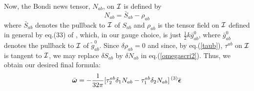 Now, the Bondi news tensor, $N_{ab}$, on ${\cal I}$ is defined by
\cite{g}
\begin{equation}
N_{ab} = \bar{S}_{ab} - \rho_{ab}
\label{news}
\end{equation}
where $\bar{S}_{ab}$ denotes the pullback to ${\cal I}$ of $S_{ab}$
and $\rho_{ab}$ is the tensor field on ${\cal I}$ defined in general
by eq.(33) of \cite{g}, which, in our gauge choice, is just
$\frac{1}{2} k \bar{g}^0_{ab}$, where $\bar{g}^0_{ab}$ denotes the
pullback to $\cal I$ of $\tilde{g}^0_{ab}$. Since $\delta \rho_{ab} =
0$ and since, by eq.(\ref{taub}), $\tau^{ab}$ on ${\cal I}$ is tangent
to ${\cal I}$, we may replace $\delta S_{ab}$ by $\delta N_{ab}$ in
eq.(\ref{omegascri2}). Thus, we obtain our desired final formula:
\begin{equation}
\bar{\mbox{\boldmath $\omega$}} = - \frac{1}{32 \pi} [\tau_{2}^{ab}
\delta_1 N_{ab} -\tau_{1}^{ab} \delta_2 N_{ab}] \, {}^{(3)}
\bar{\mbox{\boldmath $\epsilon$}}
\label{omegabar2}
\end{equation}

